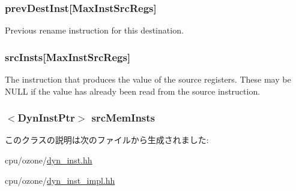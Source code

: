 \label{classOzoneDynInst_a5bb0000180ac8f071b922398c3ac227e}
\hypertarget{classOzoneDynInst_afa9f5b8c5f070a82383ea9720a61b968}{
\subsubsection[{prevDestInst}]{ {\bf prevDestInst}\mbox{[}MaxInstSrcRegs\mbox{]}}}
\label{classOzoneDynInst_afa9f5b8c5f070a82383ea9720a61b968}
Previous rename instruction for this destination. \hypertarget{classOzoneDynInst_a1b1532e26249ee7c2b50fd8e23341bf1}{
\subsubsection[{srcInsts}]{ {\bf srcInsts}\mbox{[}MaxInstSrcRegs\mbox{]}}}
\label{classOzoneDynInst_a1b1532e26249ee7c2b50fd8e23341bf1}
The instruction that produces the value of the source registers. These may be NULL if the value has already been read from the source instruction. \hypertarget{classOzoneDynInst_a13a831a5d0ecbe3db725fc446901268d}{
\subsubsection[{srcMemInsts}]{$<${\bf DynInstPtr}$>$ {\bf srcMemInsts}}}
\label{classOzoneDynInst_a13a831a5d0ecbe3db725fc446901268d}


このクラスの説明は次のファイルから生成されました:\begin{DoxyCompactItemize}
\item 
cpu/ozone/\hyperlink{ozone_2dyn__inst_8hh}{dyn\_\-inst.hh}\item 
cpu/ozone/\hyperlink{ozone_2dyn__inst__impl_8hh}{dyn\_\-inst\_\-impl.hh}\end{DoxyCompactItemize}
